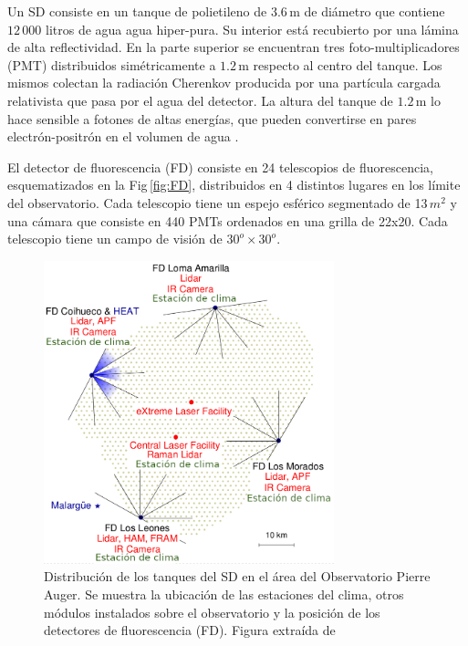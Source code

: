 Un SD consiste en un tanque de polietileno de $3.6\,$m de diámetro que contiene $12\,000$ litros de agua agua hiper-pura. Su interior está recubierto por una lámina de alta reflectividad. En la parte superior se encuentran tres foto-multiplicadores (PMT) distribuidos simétricamente  a $1.2\,$m respecto al centro del tanque. Los mismos colectan la radiación Cherenkov producida por una partícula cargada relativista que pasa por el agua del detector. La altura del tanque de $1.2\,$m lo hace sensible a fotones de altas energías, que pueden convertirse en pares electrón-positrón en el volumen de agua \cite{como_funciona_auger}.

El detector de fluorescencia (FD) consiste en 24 telescopios de fluorescencia, esquematizados en la Fig\,\ref{fig:FD}, distribuidos en 4 distintos lugares en los límite del observatorio. %
Cada telescopio tiene un espejo esférico segmentado de 13$\,m^2$ y una cámara que consiste en 440 PMTs ordenados en una grilla de 22x20. Cada telescopio tiene un campo de visión de $30^o\times30^o$.%

\begin{figure}[H]
	\centering
	\includegraphics[width=0.75\textwidth]{auger_sd.png}
	\caption{Distribución de los tanques del SD en el área del Observatorio Pierre Auger. Se muestra la ubicación de las estaciones del clima, otros módulos instalados sobre el observatorio y la posición de los detectores de fluorescencia (FD). Figura extraída de \cite{como_funciona_auger}}
	\label{fig:auger_sd}
\end{figure}

